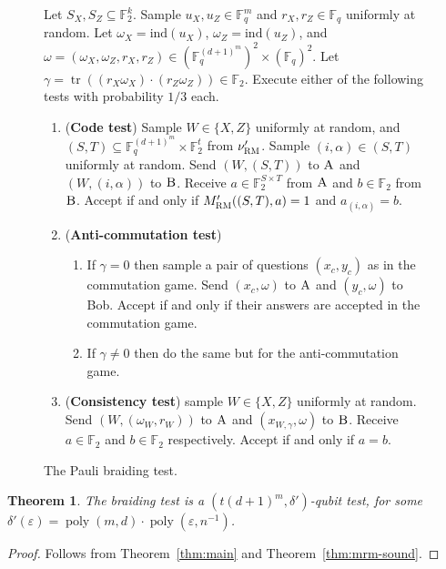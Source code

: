 \documentclass[11pt]{article}
\newtheorem{theorem}{Theorem}[section]
\theoremstyle{definition}
\newcommand{\field}{\mathbb{F}_2}
\newcommand{\F}{\ensuremath{\mathbb{F}}}
\newcommand{\RM}{\ensuremath{\textsc{RM}}}
\newcommand{\ind}{\ensuremath{\mathrm{ind}}}
\DeclareMathOperator{\poly}{poly}
\newcommand{\eps}{\varepsilon}
\DeclareMathOperator{\tr}{tr}
\newcommand{\labelstyle}[1]{\ensuremath{\textsc{#1}}\xspace}
\newcommand{\alice}{\labelstyle{A}}
\newcommand{\bob}{\labelstyle{B}}
\newenvironment{gamespec}{
  \begin{mdframed}[style=figstyle]}{
  \end{mdframed}}
\begin{document}
\begin{figure}[!htbp]
  \centering
  \begin{gamespec}
Let $S_X,S_Z\subseteq \field^k$.  Sample $u_X,u_Z \in \F_q^m$ and $r_X,r_Z\in \F_q$ uniformly at random. Let $\omega_X = \ind(u_X)$, $\omega_Z=\ind(u_Z)$, and  $\omega = (\omega_X,\omega_Z,r_X,r_Z)\in (\F_q^{(d+1)^m})^2 \times (\F_q)^2$. Let 
$\gamma = \tr((r_X\omega_X) \cdot (r_Z\omega_Z)) \in \F_2$.
 Execute either of the following tests with probability $1/3$ each. 
\begin{enumerate}
      \setlength\itemsep{1pt}
    \item (\textbf{Code test}) Sample $W\in \{X,Z\}$ uniformly at random, and $(S,T)\subseteq \F_q^{(d+1)^m} \times \F_2^t$ from $\nu'_\RM$. Sample $(i,\alpha)\in (S,T)$ uniformly at random. Send $(W,(S,T))$ to $\alice$ and $(W,(i,\alpha))$ to $\bob$. Receive $a\in \F_2^{S\times T}$ from $\alice$ and $b\in \F_2$ from $\bob$. Accept if and only if $M'_\RM((S,T),a)=1$ and $a_{(i,\alpha)} = b$.  
    \item (\textbf{Anti-commutation test}) 
		\begin{enumerate}
		\item If $\gamma=0$ then sample a pair of questions $(x_c,y_c)$ as in the commutation game. Send $(x_c,\omega)$ to $\alice$ and $(y_c,\omega)$ to Bob. Accept if and only if their answers are accepted in the commutation game. 
		\item If $\gamma\neq 0$ then do the same but for the anti-commutation game. 
		\end{enumerate} 
		 \item (\textbf{Consistency test}) sample $W\in \{X,Z\}$ uniformly at random. Send $(W,(\omega_W,r_W))$ to $\alice$ and $(x_{W,\gamma},\omega)$ to $\bob$. Receive $a\in \F_2$ and $b\in \F_2$ respectively. Accept if and only if $a=b$. 
    \end{enumerate}
  \end{gamespec}
  \caption{The Pauli braiding test.}
  \label{fig:pauli-braiding}
\end{figure}




\begin{theorem}
The braiding test is a $(t(d+1)^m,\delta')$-qubit test, for some $\delta'(\eps)=\poly(m,d)\cdot \poly(\eps,n^{-1})$.
\end{theorem}

\begin{proof}
Follows from Theorem~\ref{thm:main} and Theorem~\ref{thm:mrm-sound}.
\end{proof}
\end{document}
